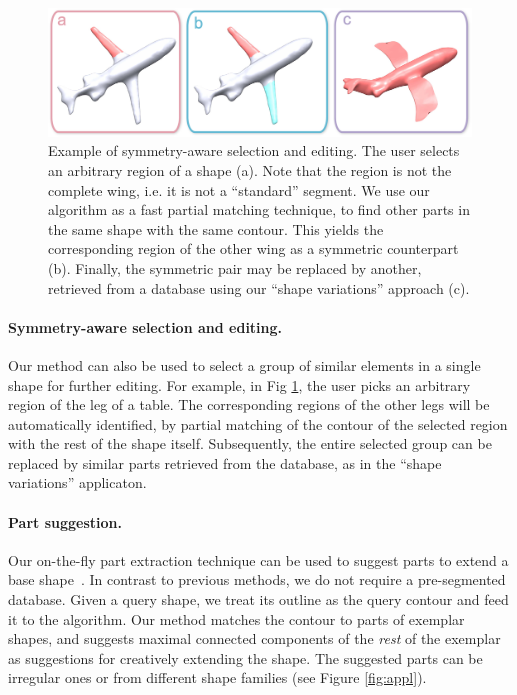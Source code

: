 \begin{figure}\centering
\includegraphics[width=1.0\linewidth]{./Material/SymSel.pdf}
\caption{Example of symmetry-aware selection and editing. The user selects an arbitrary region of a shape (a). Note that the region is not the complete wing, i.e. it is not a ``standard'' segment. We use our algorithm as a fast partial matching technique, to find other parts in the same shape with the same contour. This yields the corresponding region of the other wing as a symmetric counterpart (b). Finally, the symmetric pair may be replaced by another, retrieved from a database using our ``shape variations'' approach (c).}\label{fig:SymSel}
\end{figure}

\paragraph*{Symmetry-aware selection and editing.} Our method can also be used to select a group of similar elements in a single shape for further editing. For example, in Fig \ref{fig:SymSel}, the user picks an arbitrary region of the leg of a table. The corresponding regions of the other legs will be automatically identified, by partial matching of the contour of the selected region with the rest of the shape itself. Subsequently, the entire selected group can be replaced by similar parts retrieved from the database, as in the ``shape variations'' applicaton.

\paragraph*{Part suggestion.} Our on-the-fly part extraction technique can be used to suggest parts to extend a base shape~\cite{datadrivenvladenaisa2010,probabilisticreasoningvladlensg2011}. In contrast to previous methods, we do not require a pre-segmented database. Given a query shape, we treat its outline as the query contour and feed it to the algorithm. Our method matches the contour to parts of exemplar shapes, and suggests maximal connected components of the {\em rest} of the exemplar as suggestions for creatively extending the shape. The suggested parts can be irregular ones or from different shape families (see Figure \ref{fig:appl}).

